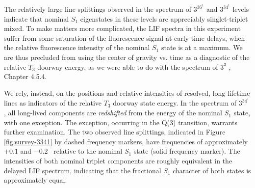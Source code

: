 \documentclass[12pt]{mitthesis}
\begin{document}
The relatively large line splittings observed in the spectrum of
$3^36^1$  and $3^34^1$  levels indicate that nominal $S_1$
eigenstates in these levels are appreciably singlet-triplet mixed.  To
make matters more complicated, the LIF spectra in this experiment
suffer from some saturation of the fluorescence signal at early time
delays, when the relative fluorescence intensity of the nominal $S_1$
state is at a maximum. We are thus precluded from using the center of
gravity vs. time as a diagnostic of the relative $T_3$ doorway energy,
as we were able to do with the spectrum of $3^3$ , Chapter
4.5.4.

We rely, instead, on the positions and relative intensities of
resolved, long-lifetime lines as indicators of the relative $T_3$
doorway state energy.  In the spectrum of $3^34^1$ , all
long-lived components are \emph{redshifted} from the energy of the
nominal $S_1$ state, with one exception.  The exception, occurring in
the Q(3) transition, warrants further examination.  The two observed
line splittings, indicated in Figure \ref{fig:survey-3341} by dashed
frequency markers, have frequencies of approximately $+0.1$ and $-0.2$
\rcm\ relative to the nominal $S_1$ state (solid frequency marker).
The intensities of both nominal triplet components are roughly
equivalent in the delayed LIF spectrum, indicating that the fractional
$S_1$ character of both states is approximately equal.
\end{document}
